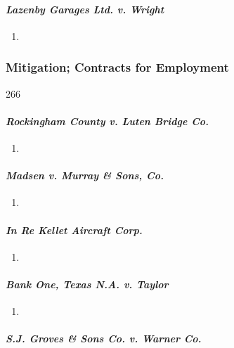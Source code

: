 \paragraph{\emph{Lazenby Garages Ltd. v. Wright}}

\begin{enumerate}
    \item %
\end{enumerate}

\subsubsection{Mitigation; Contracts for Employment} 266

\paragraph{\emph{Rockingham County v. Luten Bridge Co.}}

\begin{enumerate}
    \item %
\end{enumerate}

\paragraph{\emph{Madsen v. Murray \& Sons, Co.}}

\begin{enumerate}
    \item %
\end{enumerate}

\paragraph{\emph{In Re Kellet Aircraft Corp.}}

\begin{enumerate}
    \item %
\end{enumerate}

\paragraph{\emph{Bank One, Texas N.A. v. Taylor}}

\begin{enumerate}
    \item %
\end{enumerate}

\paragraph{\emph{S.J. Groves \& Sons Co. v. Warner Co.}}

